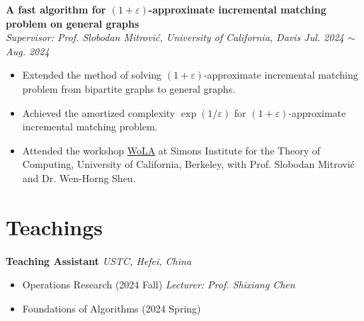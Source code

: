 \documentclass[a4paper,12pt]{ctexart}
\begin{document}
\textbf{A fast algorithm for $(1 + \varepsilon)$-approximate incremental matching problem on general graphs} \\
\textit{Supervisor: Prof. Slobodan Mitrović, University of California, Davis \hfill Jul. 2024 $\sim$ Aug. 2024}  \vspace{-0.1cm}
\begin{itemize}
    \item Extended the method of solving $(1 + \varepsilon)$-approximate incremental matching problem from bipartite graphs to general graphs.  \vspace{-0.25cm}
    \item Achieved the amortized complexity $\exp(1 / \varepsilon)$ for $(1 + \varepsilon)$-approximate incremental matching problem.  \vspace{-0.25cm}
    \item Attended the workshop \href{https://simons.berkeley.edu/workshops/workshop-local-algorithms-wola}{WoLA} at Simons Institute for the Theory of Computing, University of California, Berkeley, with Prof. Slobodan Mitrović and Dr. Wen-Horng Sheu.
\end{itemize}




\section{\textbf{Teachings}}
\textbf{Teaching Assistant} \hfill \textit{USTC, Hefei, China}  \vspace{-0.1cm}
\begin{itemize}
    \item Operations Research (2024 Fall)  \hfill \textit{Lecturer: Prof. Shixiang Chen} \vspace{-0.25cm}
    \item Foundations of Algorithms (2024 Spring)  
\end{itemize}
\end{document}
